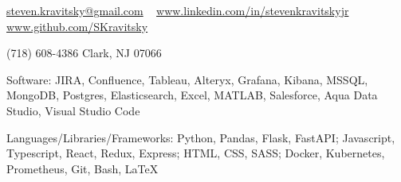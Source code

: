 \documentclass[10pt,letterpaper]{article}
\begin{document}
\sloppy  %

\nobreakvspace{0.3em}

\noindent
\href{mailto:steven.kravitsky@gmail.com}{steven.kravitsky\mbox{}@\mbox{}gmail.com} \ \faEnvelopeO
\sbull
\href{https://www.linkedin.com/in/stevenkravitskyjr}{www.linkedin.com/in/stevenkravitskyjr} \ \faLinkedinSquare
\sbull
\href{https://github.com/SKravitsky}{www.github.com/SKravitsky} \ \faGithub

\noindent
(718) 608-4386
\sbull
Clark, NJ 07066

\spacedhrule{0.9em}{-0.4em}  %


\inlineheadsection  %
  {Software:}
  {JIRA, Confluence, Tableau, Alteryx, Grafana, Kibana, MSSQL, MongoDB, Postgres, Elasticsearch, Excel, MATLAB, Salesforce, Aqua Data Studio, Visual Studio Code}

\vspace{0.75em}
\inlineheadsection
  {Languages/Libraries/Frameworks:}
  {Python, Pandas, Flask, FastAPI; Javascript, Typescript, React, Redux, Express; HTML, CSS, SASS; Docker, Kubernetes, Prometheus, Git, Bash, LaTeX}

\spacedhrule{1.8em}{-0.4em}

\end{document}
